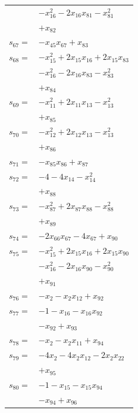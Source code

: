 \begin{longtable}{@{}r@{\;}l@{}}
 & \(\displaystyle -x_{16}^{2} -2x_{16}x_{81} -x_{81}^{2}\) \\
 & \(\displaystyle +x_{82}\) \\[3pt]
\(s_{67}=\) & \(\displaystyle -x_{45}x_{67} +x_{83}\) \\[3pt]
\(s_{68}=\) & \(\displaystyle -x_{15}^{2} +2x_{15}x_{16} +2x_{15}x_{83}\) \\
 & \(\displaystyle -x_{16}^{2} -2x_{16}x_{83} -x_{83}^{2}\) \\
 & \(\displaystyle +x_{84}\) \\[3pt]
\(s_{69}=\) & \(\displaystyle -x_{11}^{2} +2x_{11}x_{13} -x_{13}^{2}\) \\
 & \(\displaystyle +x_{85}\) \\[3pt]
\(s_{70}=\) & \(\displaystyle -x_{12}^{2} +2x_{12}x_{13} -x_{13}^{2}\) \\
 & \(\displaystyle +x_{86}\) \\[3pt]
\(s_{71}=\) & \(\displaystyle -x_{85}x_{86} +x_{87}\) \\[3pt]
\(s_{72}=\) & \(\displaystyle -4 -4x_{14} -x_{14}^{2}\) \\
 & \(\displaystyle +x_{88}\) \\[3pt]
\(s_{73}=\) & \(\displaystyle -x_{87}^{2} +2x_{87}x_{88} -x_{88}^{2}\) \\
 & \(\displaystyle +x_{89}\) \\[3pt]
\(s_{74}=\) & \(\displaystyle -2x_{66}x_{67} -4x_{67} +x_{90}\) \\[3pt]
\(s_{75}=\) & \(\displaystyle -x_{15}^{2} +2x_{15}x_{16} +2x_{15}x_{90}\) \\
 & \(\displaystyle -x_{16}^{2} -2x_{16}x_{90} -x_{90}^{2}\) \\
 & \(\displaystyle +x_{91}\) \\[3pt]
\(s_{76}=\) & \(\displaystyle -x_{2} -x_{2}x_{12} +x_{92}\) \\[3pt]
\(s_{77}=\) & \(\displaystyle -1 -x_{16} -x_{16}x_{92}\) \\
 & \(\displaystyle -x_{92} +x_{93}\) \\[3pt]
\(s_{78}=\) & \(\displaystyle -x_{2} -x_{2}x_{11} +x_{94}\) \\[3pt]
\(s_{79}=\) & \(\displaystyle -4x_{2} -4x_{2}x_{12} -2x_{2}x_{22}\) \\
 & \(\displaystyle +x_{95}\) \\[3pt]
\(s_{80}=\) & \(\displaystyle -1 -x_{15} -x_{15}x_{94}\) \\
 & \(\displaystyle -x_{94} +x_{96}\) \\[3pt]

\end{longtable}
